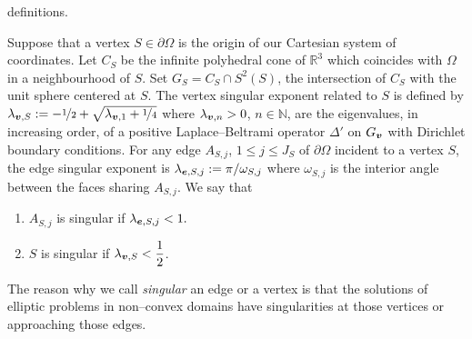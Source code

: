 definitions. 
\begin{defi}
Suppose that a vertex
$S\in\partial\Omega$ is the origin of our Cartesian system of coordinates. Let $C_{S}$ be the infinite
polyhedral cone of $\mathbb{R}^3$ which coincides with $\Omega$ in a neighbourhood of 
$S$. Set $G_{S} = C_{S}\cap S^2(S)$, the intersection of $C_{S}$ with
the unit sphere centered at $S$. The vertex singular exponent related to $S$
is defined by $\lambda_{\boldsymbol{v},S} := -\nicefrac12 + \sqrt{\lambda_{\boldsymbol{v},1} + \nicefrac14}$
where 
$\lambda_{\boldsymbol{v},n} > 0$, $n\in\mathbb{N}$, are the eigenvalues, in increasing order, of a positive
Laplace--Beltrami operator $\Delta'$ on $G_{\boldsymbol{v}}$ with Dirichlet boundary
conditions. For any edge $A_{S,j}$, $1\leqslant j\leqslant J_S$
of $\partial\Omega$ incident to a vertex $S$, the edge
singular exponent is 
$\lambda_{\boldsymbol{e},S,j} := \pi/\omega_{S,j}$ where $\omega_{S,j}$ is the interior angle between
the faces sharing  $A_{S,j}$.
We say that
  \begin{enumerate}
    \item $A_{S,j}$ is singular if $\lambda_{\boldsymbol{e},S,j} < 1.$ 
    \item $S$ is singular if $\lambda_{\boldsymbol{v},S} < \dfrac12$.
  \end{enumerate}
\end{defi}
The reason why we call \textsl{singular} an edge or a vertex is that
the solutions of elliptic problems in non--convex domains have singularities
at those vertices or approaching those edges.
